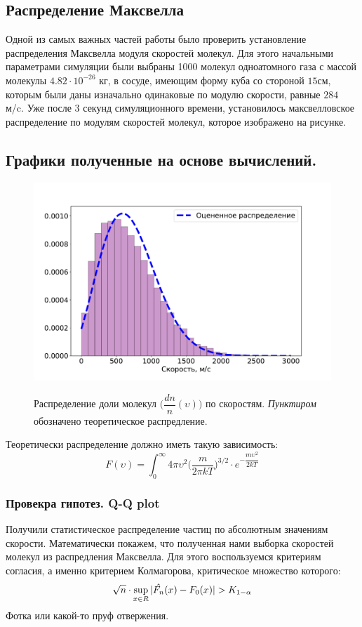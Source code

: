 \documentclass[twoside,twocolumn, 11pt]{article}
\theoremstyle{plain}
\theoremstyle{definition}
\DeclarePairedDelimiter\abs{\lvert}{\rvert} %
\begin{document}
\subsection{Распределение Максвелла}

\indent Одной из самых важных частей работы было проверить установление распределения Максвелла модуля скоростей молекул. Для этого начальными параметрами симуляции были выбраны 1000 молекул одноатомного газа с массой молекулы $4.82 \cdot 10^{-26}$ кг, в сосуде, имеющим форму куба со стороной $15$см, которым были даны изначально одинаковые по модулю скорости, равные $284$ м/c. Уже после 3 секунд симуляционного времени, установилось максвелловское распределение по модулям скоростей молекул, которое изображено на рисунке.\\

\subsection{Графики полученные на основе вычислений.}
\begin{figure}[!h]
{\includegraphics[width=1\linewidth]{hist_v}}
\caption{Распределение доли молекул $\Big(\dfrac{dn}{n} (\upsilon) \Big)$ по скоростям. \textit{Пунктиром} обозначено теоретическое распредление. }
\end{figure}

\indent Теоретически распределение должно иметь такую зависимость:
\begin{equation}
F(\upsilon) = \int_0^\infty 4\pi\upsilon^2 \Big( \dfrac{m}{2\pi kT} \Big)^{3/2}\cdot e^{-\dfrac{m \upsilon^2}{2kT}}
\end{equation}

\subsubsection{Провекра гипотез. Q-Q plot}
\indent Получили статистическое распределение частиц по абсолютным значениям скорости.
Математически покажем, что полученная нами выборка скоростей молекул из распредления Максвелла. Для этого воспользуемся критериям согласия,
а именно критерием Колмагорова, критическое множество которого:
\[\sqrt{n} \cdot \sup\limits_{x \in R}{\abs{\hat{F_n}(x)- F_0(x)} > K_{1-\alpha}} \]
Фотка или какой-то пруф отвержения.
\end{document}

